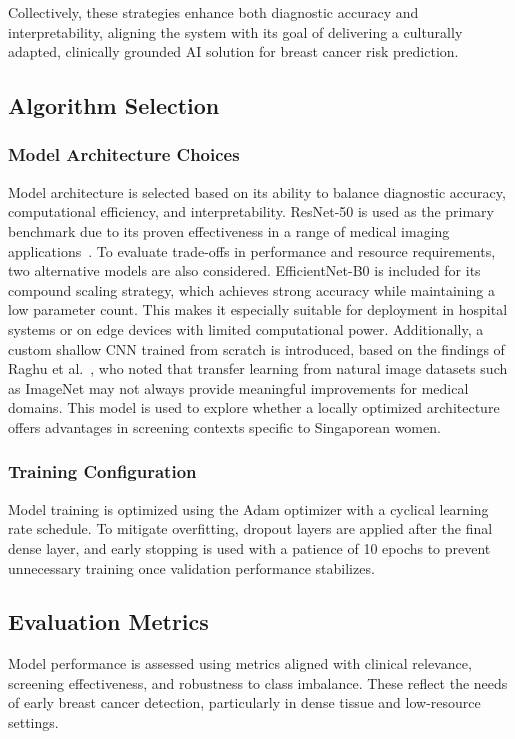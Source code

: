 \documentclass[12pt]{article}
\begin{document}
Collectively, these strategies enhance both diagnostic accuracy and interpretability, aligning the system with its goal of delivering a culturally adapted, clinically grounded AI solution for breast cancer risk prediction.

\subsection{Algorithm Selection}
\subsubsection{Model Architecture Choices}
Model architecture is selected based on its ability to balance diagnostic accuracy, computational efficiency, and interpretability. ResNet-50 is used as the primary benchmark due to its proven effectiveness in a range of medical imaging applications~\cite{1,7}. To evaluate trade-offs in performance and resource requirements, two alternative models are also considered. EfficientNet-B0 is included for its compound scaling strategy, which achieves strong accuracy while maintaining a low parameter count. This makes it especially suitable for deployment in hospital systems or on edge devices with limited computational power. Additionally, a custom shallow CNN trained from scratch is introduced, based on the findings of Raghu et al.~\cite{2}, who noted that transfer learning from natural image datasets such as ImageNet may not always provide meaningful improvements for medical domains. This model is used to explore whether a locally optimized architecture offers advantages in screening contexts specific to Singaporean women.

\subsubsection{Training Configuration}
Model training is optimized using the Adam optimizer with a cyclical learning rate schedule. To mitigate overfitting, dropout layers are applied after the final dense layer, and early stopping is used with a patience of 10 epochs to prevent unnecessary training once validation performance stabilizes.

\subsection{Evaluation Metrics}
\label{sec:evaluation_metrics}
Model performance is assessed using metrics aligned with clinical relevance, screening effectiveness, and robustness to class imbalance. These reflect the needs of early breast cancer detection, particularly in dense tissue and low-resource settings.
\end{document}
